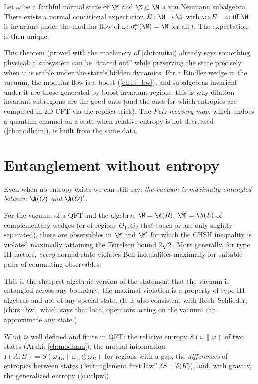 \begin{theorem}[Takesaki]
Let $\omega$ be a faithful normal state of $\M$ and $\N\subset\M$ a von Neumann subalgebra. There exists a normal conditional expectation $E:\M\to\N$ with $\omega\circ E=\omega$ iff $\N$ is invariant under the modular flow of $\omega$: $\sigma^\omega_t(\N)=\N$ for all $t$. The expectation is then unique.
\end{theorem}
This theorem (proved with the machinery of \cref{ch:tomita}) already says something physical: a subsystem can be ``traced out'' while preserving the state precisely when it is stable under the state's hidden dynamics. For a Rindler wedge in the vacuum, the modular flow is a boost (\cref{ch:rs_bw}), and subalgebras invariant under it are those generated by boost-invariant regions: this is why dilation-invariant subregions are the good ones (and the ones for which entropies are computed in 2D CFT via the replica trick). The \emph{Petz recovery map}, which undoes a quantum channel on a state when relative entropy is not decreased (\cref{ch:modham}), is built from the same data.

\section{Entanglement without entropy}

Even when no entropy exists we can still say: \emph{the vacuum is maximally entangled between $\A(O)$ and $\A(O)'$.}

\begin{theorem}
For the vacuum of a QFT and the algebras $\M=\A(R)$, $\M'=\A(L)$ of complementary wedges (or of regions $O_1,O_2$ that touch or are only slightly separated), there are observables in $\M$ and $\M'$ for which the CHSH inequality is violated maximally, attaining the Tsirelson bound $2\sqrt2$. More generally, for type III factors, \emph{every} normal state violates Bell inequalities maximally for suitable pairs of commuting observables.
\end{theorem}
This is the sharpest algebraic version of the statement that the vacuum is entangled across any boundary: the maximal violation is a property of type III algebras and not of any special state. (It is also consistent with Reeh--Schlieder, \cref{ch:rs_bw}, which says that local operators acting on the vacuum can approximate any state.)

What \emph{is} well defined and finite in QFT: the relative entropy $S(\omega\|\varphi)$ of two states (Araki, \cref{ch:modham}), the mutual information $I(A:B)=S(\omega_{AB}\|\omega_A\otimes\omega_B)$ for regions with a gap, the \emph{differences} of entropies between states (``entanglement first law'' $\delta S=\delta\langle K\rangle$), and, with gravity, the generalized entropy (\cref{ch:clpw}).

